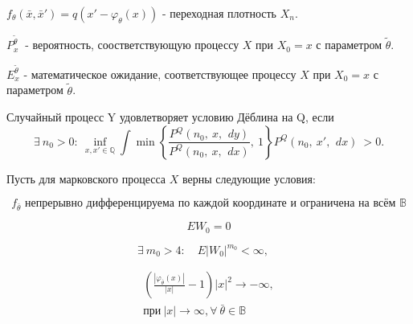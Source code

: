 \begin{Designation}
    $f_{\theta}(\bar{x},\bar{x}')=q(x'-\varphi_{\theta}(x))$ - переходная плотность $X_n$.
\end{Designation}

\begin{Designation}
	$ P^{\tilde{\theta}}_x \ $ - вероятность, соостветствующую процессу $X$ при $X_0=x$ с параметром $\tilde{\theta}$.
\end{Designation}

\begin{Designation}
	$E^{\tilde{\theta}}_x$ - математическое ожидание, соответствующее процессу $X$ при $X_0=x$ с параметром $\tilde{\theta}$.
\end{Designation}

\begin{Definition}
Случайный процесс Y удовлетворяет условию Дёблина на Q, если
$$
    \exists \ n_0>0 : \ \inf_{x, x' \in \mathbb{Q}} \int \min \left\{\frac{P^Q\left(n_0, \ x, \ \,dy\right)}{P^Q\left(n_0, \ x, \ \,dx\right)}, \ 1\right\} P^Q \left(n_0, \ x', \ \,dx\right) \ > 0.
$$ \label{Deblin}
\end{Definition}

Пусть для марковского процесса $X$ верны следующие условия:

\begin{equation} \label{assumption1}
    f_{\bar{\theta}} \text{ непрерывно дифференцируема по каждой координате и ограничена на всём $\mathbb{B}$}
\end{equation}

\begin{equation} \label{assumption2}
    E W_0=0
\end{equation}
    
\begin{equation} \label{assumption3}
    \exists \ m_0 > 4 : \quad E\left|W_0\right|^{m_0} < \infty, \quad
\end{equation}

\begin{equation} \label{assumption4}
    \begin{split}
         \left(\frac{\left|\varphi_{\bar{\theta}}(x)\right|}{|x|} - 1\right)\left|x\right|^2 \rightarrow -\infty, \\ \text{при} \ |x| \rightarrow \infty, \forall \ \bar{\theta}\in \mathbb{B}
     \end{split}
\end{equation}

